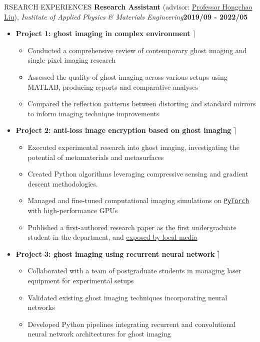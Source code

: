 \documentclass[10pt]{article} %
\begin{document}
\begin{section}{RSEARCH EXPERIENCES}
\textbf{Research Assistant} (advisor: \href{mailto:hcliu@um.edu.mo}{Professor Hongchao Liu}), \textit{Institute of Applied Physics \& Materials Engineering}\hfill \textbf{2019/09 - 2022/05} 
\begin{itemize}[leftmargin=1.5em]
    \item \textbf{Project 1: ghost imaging in complex environment} \hfill $\rceil$ %
    \begin{itemize}[leftmargin=1.5em]
        \item Conducted a comprehensive review of contemporary ghost imaging and single-pixel imaging research
        \item Assessed the quality of ghost imaging across various setups using MATLAB, producing reports and comparative analyses
        \item Compared the reflection patterns between distorting and standard mirrors to inform imaging technique improvements
    \end{itemize}
    \item \textbf{Project 2: anti-loss image encryption based on ghost imaging} \hfill $\rceil$ %
    \begin{itemize}[leftmargin=1.5em]
        \item Executed experimental research into ghost imaging, investigating the potential of metamaterials and metasurfaces
        \item Created Python algorithms leveraging compressive sensing and gradient descent methodologies.
        \item Managed and fine-tuned computational imaging simulations on \href{https://pytorch.org/}{\texttt{PyTorch}} with high-performance GPUs
        \item Published a first-authored research paper as the first undergraduate student in the department, and \href{https://www.tdm.com.mo/en/news-detail/683438?isvideo=false&lang=en&category=all}{exposed by local media} 
    \end{itemize}
    \item \textbf{Project 3: ghost imaging using recurrent neural network} \hfill $\rceil$ %
    \begin{itemize}[leftmargin=1.5em]
        \item Collaborated with a team of postgraduate students in managing laser equipment for experimental setups
        \item Validated existing ghost imaging techniques incorporating neural networks
        \item Developed Python pipelines integrating recurrent and convolutional neural network architectures for ghost imaging
    \end{itemize}
\end{itemize}

\end{section}
\end{document}
